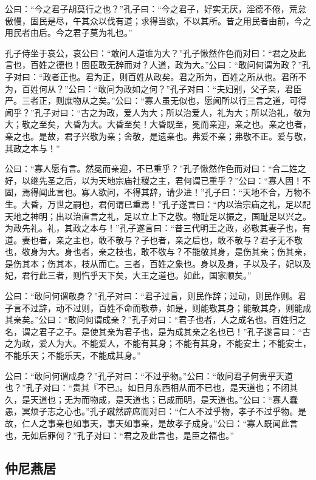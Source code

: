 \documentclass[]{article}
\begin{document}
公曰：``今之君子胡莫行之也？''孔子曰：``今之君子，好实无厌，淫德不倦，荒怠傲慢，固民是尽，午其众以伐有道；求得当欲，不以其所。昔之用民者由前，今之用民者由后。今之君子莫为礼也。''

孔子侍坐于哀公，哀公曰：``敢问人道谁为大？''孔子愀然作色而对曰：``君之及此言也，百姓之德也！固臣敢无辞而对？人道，政为大。''公曰：``敢问何谓为政？''孔子对曰：``政者正也。君为正，则百姓从政矣。君之所为，百姓之所从也。君所不为，百姓何从？''公曰：``敢问为政如之何？''孔子对曰：``夫妇别，父子亲，君臣严。三者正，则庶物从之矣。''公曰：``寡人虽无似也，愿闻所以行三言之道，可得闻乎？''孔子对曰：``古之为政，爱人为大；所以治爱人，礼为大；所以治礼，敬为大；敬之至矣，大昏为大。大昏至矣！大昏既至，冕而亲迎，亲之也。亲之也者，亲之也。是故，君子兴敬为亲；舍敬，是遗亲也。弗爱不亲；弗敬不正。爱与敬，其政之本与！''

公曰：``寡人愿有言。然冕而亲迎，不已重乎？''孔子愀然作色而对曰：``合二姓之好，以继先圣之后，以为天地宗庙社稷之主，君何谓已重乎？''公曰：``寡人固！不固，焉得闻此言也。寡人欲问，不得其辞，请少进！''孔子曰：``天地不合，万物不生。大昏，万世之嗣也，君何谓已重焉！''孔子遂言曰：``内以治宗庙之礼，足以配天地之神明；出以治直言之礼，足以立上下之敬。物耻足以振之，国耻足以兴之。为政先礼。礼，其政之本与！''孔子遂言曰：``昔三代明王之政，必敬其妻子也，有道。妻也者，亲之主也，敢不敬与？子也者，亲之后也，敢不敬与？君子无不敬也，敬身为大。身也者，亲之枝也，敢不敬与？不能敬其身，是伤其亲；伤其亲，是伤其本；伤其本，枝从而亡。三者，百姓之象也。身以及身，子以及子，妃以及妃，君行此三者，则忾乎天下矣，大王之道也。如此，国家顺矣。''

公曰：``敢问何谓敬身？''孔子对曰：``君子过言，则民作辞；过动，则民作则。君子言不过辞，动不过则，百姓不命而敬恭，如是，则能敬其身；能敬其身，则能成其亲矣。''公曰：``敢问何谓成亲？''孔子对曰：``君子也者，人之成名也。百姓归之名，谓之君子之子。是使其亲为君子也，是为成其亲之名也已！''孔子遂言曰：``古之为政，爱人为大。不能爱人，不能有其身；不能有其身，不能安土；不能安土，不能乐天；不能乐天，不能成其身。''

公曰：``敢问何谓成身？''孔子对曰：``不过乎物。''公曰：``敢问君子何贵乎天道也？''孔子对曰：``贵其『不已』。如日月东西相从而不已也，是天道也；不闭其久，是天道也；无为而物成，是天道也；已成而明，是天道也。''公曰：``寡人蠢愚，冥烦子志之心也。''孔子蹴然辟席而对曰：``仁人不过乎物，孝子不过乎物。是故，仁人之事亲也如事天，事天如事亲，是故孝子成身。''公曰：``寡人既闻此言也，无如后罪何？''孔子对曰：``君之及此言也，是臣之福也。''

\hypertarget{header-n678}{%
\subsection{仲尼燕居}\label{header-n678}}
\end{document}
